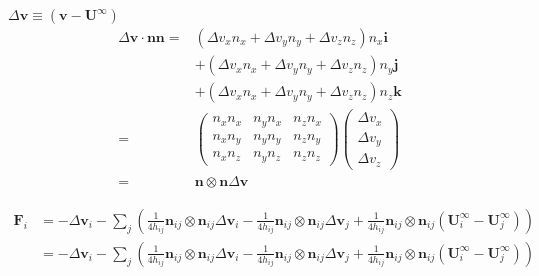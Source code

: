 \documentclass[12pt]{article}
\begin{document}
$\Delta \bm{v} \equiv (\bm{v}- \bm{U}^{\infty})$
\begin{align}
\Delta \bm{v} \cdot
\bm{n} \bm{n}
= &
(\Delta v_x n_x 
+\Delta v_y n_y
+\Delta v_z n_z) n_x \bm{i}\\
& 
+ (\Delta v_x n_x 
+\Delta v_y n_y
+\Delta v_z n_z) n_y \bm{j}\\
&
+ (\Delta v_x n_x 
+\Delta v_y n_y
+\Delta v_z n_z) n_z \bm{k} \\
=&
\begin{pmatrix}
 n_x n_x &   n_y n_x &   n_z n_x \\
 n_x n_y &   n_y n_y &   n_z n_y \\
 n_x n_z &   n_y n_z &   n_z n_z 
\end{pmatrix}
\begin{pmatrix}
 \Delta v_x \\
 \Delta v_y \\
 \Delta v_z 
\end{pmatrix} 
\\
=&\bm{n} \otimes \bm{n} \Delta \bm{v}
\end{align}

\begin{align}
  \bm{F}_i  &= 
  -  \Delta \bm{v}_i 
  - \sum_j
  \left(
    \frac{1}{4h_{ij}} \bm{n}_{ij} \otimes \bm{n}_{ij} \Delta \bm{v}_i
    - \frac{1}{4h_{ij}} \bm{n}_{ij} \otimes \bm{n}_{ij} \Delta \bm{v}_j 
    + \frac{1}{4h_{ij}}  
 \bm{n}_{ij} \otimes \bm{n}_{ij} (\bm{U}_i^{\infty}-\bm{U}_j^{\infty})
  \right) \\
  &=
 -  \Delta \bm{v}_i 
  - \sum_j
  \left(
    \frac{1}{4h_{ij}} \bm{n}_{ij} \otimes \bm{n}_{ij} \Delta \bm{v}_i
    - \frac{1}{4h_{ij}} \bm{n}_{ij} \otimes \bm{n}_{ij} \Delta \bm{v}_j
    + \frac{1}{4h_{ij}}  
 \bm{n}_{ij} \otimes \bm{n}_{ij} (\bm{U}_i^{\infty}-\bm{U}_j^{\infty})
\right)
  \end{align}
\end{document}
